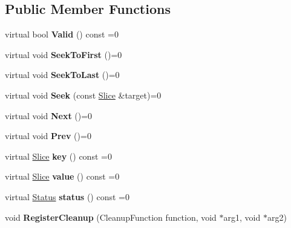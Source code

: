 \subsection*{Public Member Functions}
\begin{DoxyCompactItemize}
\item 
\mbox{\label{classleveldb_1_1_iterator_a38614978bfa0586327b8e237bcb46012}} 
virtual bool {\bfseries Valid} () const =0
\item 
\mbox{\label{classleveldb_1_1_iterator_a3594967cf26ddf1d37c7b886bb48627e}} 
virtual void {\bfseries Seek\+To\+First} ()=0
\item 
\mbox{\label{classleveldb_1_1_iterator_a8ad637f0a759e6d94cca6c5b4db440d3}} 
virtual void {\bfseries Seek\+To\+Last} ()=0
\item 
\mbox{\label{classleveldb_1_1_iterator_a97a556e97ded60c677fbf4de7321ec44}} 
virtual void {\bfseries Seek} (const \mbox{\hyperlink{classleveldb_1_1_slice}{Slice}} \&target)=0
\item 
\mbox{\label{classleveldb_1_1_iterator_aea54a5ca7eb942eb15770820529410e7}} 
virtual void {\bfseries Next} ()=0
\item 
\mbox{\label{classleveldb_1_1_iterator_a28798d802a203788587dc6adc5bc729e}} 
virtual void {\bfseries Prev} ()=0
\item 
\mbox{\label{classleveldb_1_1_iterator_ad17feced6e24a1b21db5ae6940c1f220}} 
virtual \mbox{\hyperlink{classleveldb_1_1_slice}{Slice}} {\bfseries key} () const =0
\item 
\mbox{\label{classleveldb_1_1_iterator_a613ac2e965518aad7a064c64c72bcf7c}} 
virtual \mbox{\hyperlink{classleveldb_1_1_slice}{Slice}} {\bfseries value} () const =0
\item 
\mbox{\label{classleveldb_1_1_iterator_ac84f34623a031b7eeb23409320f76376}} 
virtual \mbox{\hyperlink{classleveldb_1_1_status}{Status}} {\bfseries status} () const =0
\item 
\mbox{\label{classleveldb_1_1_iterator_a8c0281f9e4a2c9dceb37aad8128b636f}} 
void {\bfseries Register\+Cleanup} (Cleanup\+Function function, void $\ast$arg1, void $\ast$arg2)
\end{DoxyCompactItemize}


